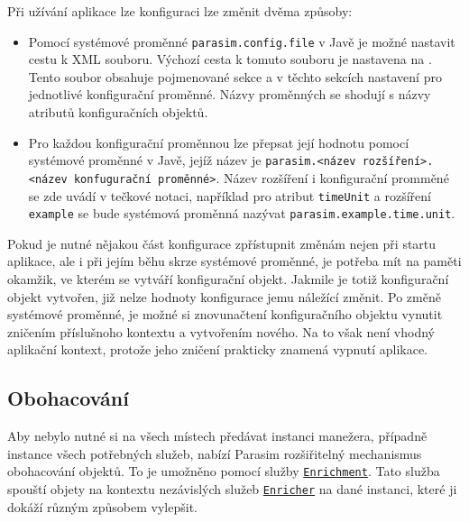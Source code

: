 Při užívání aplikace lze konfiguraci lze změnit dvěma způsoby:

\begin{itemize}
	\item	Pomocí systémové proměnné \texttt{parasim.config.file} v Javě je mož\-né nastavit cestu k XML souboru.
			Výchozí cesta k tomuto souboru je nastavena na . Tento soubor
			obsahuje pojmenované sekce a v těchto sekcích nastavení pro jednotlivé konfigurační
			pro\-měn\-né. Názvy proměnných se shodují s názvy atributů konfiguračních objektů.

	\item	Pro každou konfigurační proměnnou lze přepsat její hodnotu pomocí systémové
			proměnné v Javě, jejíž název je \texttt{parasim.<název roz\-ší\-ření>.<název konfugurační proměnné>}.
			Název rozšíření i konfigurační promměné se zde uvádí v tečkové notaci, například pro atribut \texttt{timeUnit}
			a rozšíření \texttt{example} se bude systémová proměnná nazývat \texttt{parasim.example.time.unit}.
\end{itemize}

Pokud je nutné nějakou část konfigurace zpřístupnit
změnám nejen při startu aplikace, ale i při jejím běhu skrze systémové proměnné, je potřeba mít na paměti
okamžik, ve kterém se vytváří konfigurační objekt. Jakmile je totiž konfigurační objekt vytvořen,
již nelze hodnoty konfigurace jemu náležící změnit. Po změně systémové proměnné,
je možné si znovunačtení konfiguračního objektu vynutit zničením příslušnoho kontextu
a vy\-tvo\-ře\-ním nového. Na to však není vhodný aplikační kontext, protože jeho
zničení prakticky znamená vypnutí aplikace.

\subsection{Obohacování}

Aby nebylo nutné si na všech místech předávat instanci manežera, případně instance všech
potřebných služeb, nabízí Parasim rozšiřitelný mechanismus obohacování objektů.
To je umožněno pomocí služby \href{https://github.com/sybila/parasim/blob/master/core/src/main/java/org/sybila/parasim/core/api/enrichment/Enrichment.java}{\texttt{Enrichment}}.
Tato služba spouští objety na kontextu nezávislých služeb \href{https://github.com/sybila/parasim/blob/master/core/src/main/java/org/sybila/parasim/core/spi/enrichment/Enricher.java}{\texttt{Enricher}}
na dané instanci, které ji dokáží různým způsobem vylepšit. 

